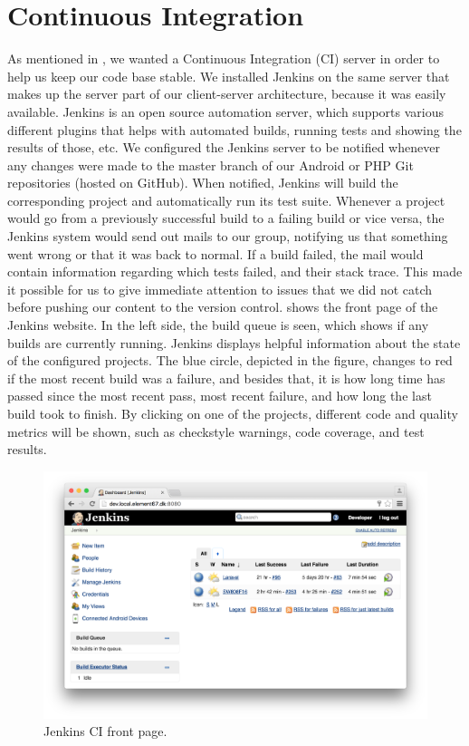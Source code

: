 
\section{Continuous Integration}
\label{sec:continuous_integration}
As mentioned in , we wanted a Continuous Integration (CI) server in order to help us keep our code base stable. We installed Jenkins on the same server that makes up the server part of our client-server architecture, because it was easily available. Jenkins is an open source automation server, which supports various different plugins that helps with automated builds, running tests and showing the results of those, etc. We configured the Jenkins server to be notified whenever any changes were made to the master branch of our Android or PHP Git repositories (hosted on GitHub). When notified, Jenkins will build the corresponding project and automatically run its test suite. Whenever a project would go from a previously successful build to a failing build or vice versa, the Jenkins system would send out mails to our group, notifying us that something went wrong or that it was back to normal. If a build failed, the mail would contain information regarding which tests failed, and their stack trace. This made it possible for us to give immediate attention to issues that we did not catch before pushing our content to the version control.  shows the front page of the Jenkins website. In the left side, the build queue is seen, which shows if any builds are currently running. Jenkins displays helpful information about the state of the configured projects. The blue circle, depicted in the figure, changes to red if the most recent build was a failure, and besides that, it is how long time has passed since the most recent pass, most recent failure, and how long the last build took to finish. By clicking on one of the projects, different code and quality metrics will be shown, such as checkstyle warnings, code coverage, and test results. 

\begin{figure}[!htbp]
    \centering
    \includegraphics[width=\textwidth]{graphic/quality_assurance/jenkins_frontpage}
    \caption{Jenkins CI front page.}
    \label{fig:jenkins_front_page}
\end{figure}
\FloatBarrier

